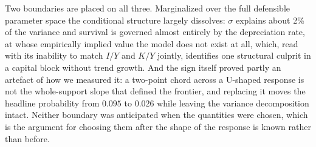 Two boundaries are placed on all three. Marginalized over the full defensible
parameter space the conditional structure largely dissolves: $\sigma$ explains
about 2\% of the variance and survival is governed almost entirely by the
depreciation rate, at whose empirically implied value the model does not exist
at all, which, read with its inability to match $I/Y$ and $K/Y$ jointly,
identifies one structural culprit in a capital block without trend growth. And
the sign itself proved partly an artefact of how we measured it: a two-point
chord across a U-shaped response is not the whole-support slope that defined
the frontier, and replacing it moves the headline probability from $0.095$ to
$0.026$ while leaving the variance decomposition intact. Neither boundary was
anticipated when the quantities were chosen, which is the argument for
choosing them after the shape of the response is known rather than before.

